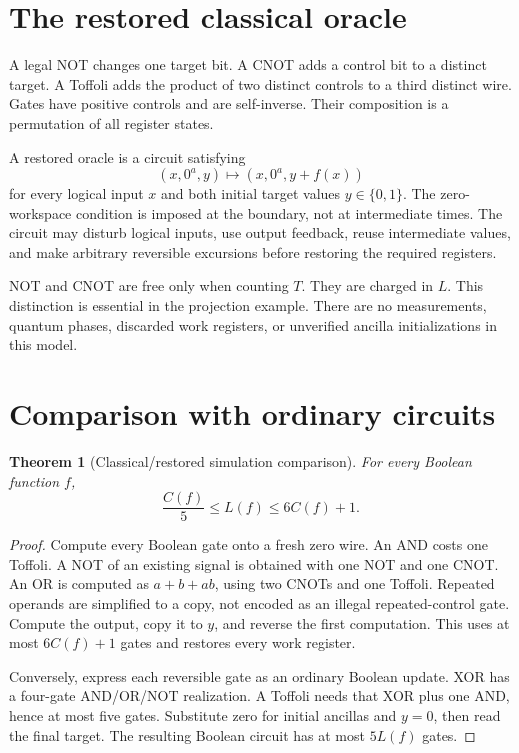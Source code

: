 \documentclass[11pt,letterpaper,oneside]{report}
\theoremstyle{komorebi}
\newtheorem{theorem}{Theorem}[chapter]
\newcommand{\B}{\{0,1\}}
\begin{document}
\section{The restored classical oracle}
A legal NOT changes one target bit. A CNOT adds a control bit to a distinct target. A Toffoli adds the product of two distinct controls to a third distinct wire. Gates have positive controls and are self-inverse. Their composition is a permutation of all register states.

A restored oracle is a circuit satisfying
\begin{equation}\label{eq:oracle}
(x,0^a,y)\longmapsto(x,0^a,y+f(x))
\end{equation}
for every logical input $x$ and both initial target values $y\in\B$. The zero-workspace condition is imposed at the boundary, not at intermediate times. The circuit may disturb logical inputs, use output feedback, reuse intermediate values, and make arbitrary reversible excursions before restoring the required registers.

NOT and CNOT are free only when counting $T$. They are charged in $L$. This distinction is essential in the projection example. There are no measurements, quantum phases, discarded work registers, or unverified ancilla initializations in this model.

\section{Comparison with ordinary circuits}
\begin{theorem}[Classical/restored simulation comparison]\label{thm:simulation}
For every Boolean function $f$,
\[
\frac{C(f)}5\le L(f)\le6C(f)+1.
\]
\end{theorem}
\begin{proof}
Compute every Boolean gate onto a fresh zero wire. An AND costs one Toffoli. A NOT of an existing signal is obtained with one NOT and one CNOT. An OR is computed as $a+b+ab$, using two CNOTs and one Toffoli. Repeated operands are simplified to a copy, not encoded as an illegal repeated-control gate. Compute the output, copy it to $y$, and reverse the first computation. This uses at most $6C(f)+1$ gates and restores every work register.

Conversely, express each reversible gate as an ordinary Boolean update. XOR has a four-gate AND/OR/NOT realization. A Toffoli needs that XOR plus one AND, hence at most five gates. Substitute zero for initial ancillas and $y=0$, then read the final target. The resulting Boolean circuit has at most $5L(f)$ gates.
\end{proof}
\end{document}
